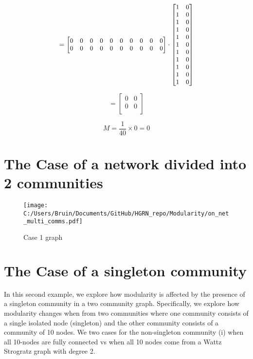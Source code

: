 \documentclass[a4paper,12pt]{article}
\begin{document}
	\[\small =\begin{bmatrix}
		0&  0&  0&  0&  0& 0& 0& 0& 0& 0 \\
		0& 0& 0& 0& 0& 0& 0& 0& 0&  0 \\
	\end{bmatrix} \cdot 
	\begin{bmatrix}
		1 & 0 \\ 
		1 & 0 \\
		1 & 0 \\
		1 & 0 \\ 
		1 & 0 \\ 
		1 & 0 \\ 
		1 & 0 \\ 
		1 & 0 \\ 
		1 & 0 \\ 
		1 & 0 \\ 
		1 & 0 
	\end{bmatrix}\]
	
	
	\[ =\begin{bmatrix}
		0 & 0 \\
		0 & 0 \\
	\end{bmatrix} \]
	
	\[M = \frac{1}{40} \times 0 = 0\]
	
	
	\newpage
	\section{The Case of a network divided into 2 communities}
	
	\begin{figure}[H]
		\centering
		\caption{Case 1 graph}
		\texttt{[image: C:/Users/Bruin/Documents/GitHub/HGRN\_repo/Modularity/on\_net\_multi\_comms.pdf]}
		\label{fig:case2}
	\end{figure}
	
	
	
	
	
	
	
	
	
	
	
	
	
	
	
	
	
	
	
	
	
	
	
	
	
	
	
	
	\newpage
		\section{The Case of a singleton community}
	In this second example, we explore how modularity is affected by the presence of a singleton community in a two community graph. Specifically, we explore how modularity changes when from two communities where one community consists of a single isolated node (singleton) and the other community consists of a community of 10 nodes. We two cases for the non-singleton community (i) when all 10-nodes are fully connected vs when all 10 nodes come from a Wattz Strogratz graph with degree 2. 	
	
\end{document}
